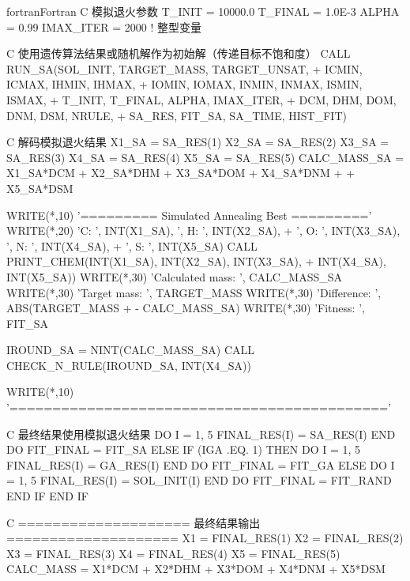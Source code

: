 \begin{envcode}{fortran}{Fortran}
C         模拟退火参数
          T_INIT = 10000.0
          T_FINAL = 1.0E-3
          ALPHA = 0.99
          IMAX_ITER = 2000    ! 整型变量
          
C         使用遗传算法结果或随机解作为初始解（传递目标不饱和度）
          CALL RUN_SA(SOL_INIT, TARGET_MASS, TARGET_UNSAT,
     +                ICMIN, ICMAX, IHMIN, IHMAX,
     +                IOMIN, IOMAX, INMIN, INMAX, ISMIN, ISMAX,
     +                T_INIT, T_FINAL, ALPHA, IMAX_ITER,
     +                DCM, DHM, DOM, DNM, DSM, NRULE,
     +                SA_RES, FIT_SA, SA_TIME, HIST_FIT)
          
C         解码模拟退火结果
          X1_SA = SA_RES(1)
          X2_SA = SA_RES(2)
          X3_SA = SA_RES(3)
          X4_SA = SA_RES(4)
          X5_SA = SA_RES(5)
          CALC_MASS_SA = X1_SA*DCM + X2_SA*DHM + X3_SA*DOM + X4_SA*DNM
     +                 + X5_SA*DSM
          
          WRITE(*,10) '========= Simulated Annealing Best ========='
          WRITE(*,20) 'C: ', INT(X1_SA), ', H: ', INT(X2_SA),
     +                ', O: ', INT(X3_SA), ', N: ', INT(X4_SA),
     +                ', S: ', INT(X5_SA)
          CALL PRINT_CHEM(INT(X1_SA), INT(X2_SA), INT(X3_SA),
     +                    INT(X4_SA), INT(X5_SA))
          WRITE(*,30) 'Calculated mass: ', CALC_MASS_SA
          WRITE(*,30) 'Target mass:     ', TARGET_MASS
          WRITE(*,30) 'Difference:      ', ABS(TARGET_MASS 
     +                - CALC_MASS_SA)
          WRITE(*,30) 'Fitness:         ', FIT_SA
          
          IROUND_SA = NINT(CALC_MASS_SA)
          CALL CHECK_N_RULE(IROUND_SA, INT(X4_SA))
          
          WRITE(*,10) '============================================'


C         最终结果使用模拟退火结果
          DO I = 1, 5
              FINAL_RES(I) = SA_RES(I)
          END DO
          FIT_FINAL = FIT_SA
      ELSE
          IF (IGA .EQ. 1) THEN
              DO I = 1, 5
                  FINAL_RES(I) = GA_RES(I)
              END DO
              FIT_FINAL = FIT_GA
          ELSE
              DO I = 1, 5
                  FINAL_RES(I) = SOL_INIT(I)
              END DO
              FIT_FINAL = FIT_RAND
          END IF
      END IF
      
C     ==================== 最终结果输出 ====================
      X1 = FINAL_RES(1)
      X2 = FINAL_RES(2)
      X3 = FINAL_RES(3)
      X4 = FINAL_RES(4)
      X5 = FINAL_RES(5)
      CALC_MASS = X1*DCM + X2*DHM + X3*DOM + X4*DNM + X5*DSM
      

\end{envcode}

